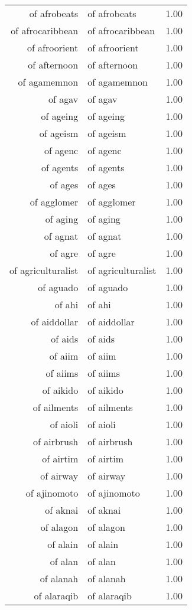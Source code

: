 \begin{table}[ht]
\begin{tabular}{rlr}
  of afrobeats & of afrobeats & 1.00 \\ 
  of afrocaribbean & of afrocaribbean & 1.00 \\ 
  of afroorient & of afroorient & 1.00 \\ 
  of afternoon & of afternoon & 1.00 \\ 
  of agamemnon & of agamemnon & 1.00 \\ 
  of agav & of agav & 1.00 \\ 
  of ageing & of ageing & 1.00 \\ 
  of ageism & of ageism & 1.00 \\ 
  of agenc & of agenc & 1.00 \\ 
  of agents & of agents & 1.00 \\ 
  of ages & of ages & 1.00 \\ 
  of agglomer & of agglomer & 1.00 \\ 
  of aging & of aging & 1.00 \\ 
  of agnat & of agnat & 1.00 \\ 
  of agre & of agre & 1.00 \\ 
  of agriculturalist & of agriculturalist & 1.00 \\ 
  of aguado & of aguado & 1.00 \\ 
  of ahi & of ahi & 1.00 \\ 
  of aiddollar & of aiddollar & 1.00 \\ 
  of aids & of aids & 1.00 \\ 
  of aiim & of aiim & 1.00 \\ 
  of aiims & of aiims & 1.00 \\ 
  of aikido & of aikido & 1.00 \\ 
  of ailments & of ailments & 1.00 \\ 
  of aioli & of aioli & 1.00 \\ 
  of airbrush & of airbrush & 1.00 \\ 
  of airtim & of airtim & 1.00 \\ 
  of airway & of airway & 1.00 \\ 
  of ajinomoto & of ajinomoto & 1.00 \\ 
  of aknai & of aknai & 1.00 \\ 
  of alagon & of alagon & 1.00 \\ 
  of alain & of alain & 1.00 \\ 
  of alan & of alan & 1.00 \\ 
  of alanah & of alanah & 1.00 \\ 
  of alaraqib & of alaraqib & 1.00 \\ 

\end{tabular}
\end{table}
